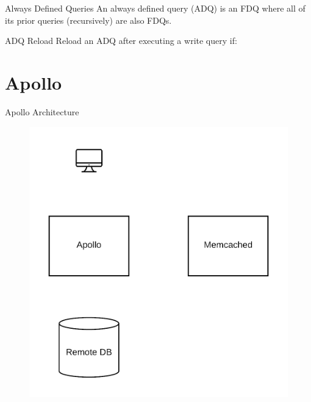 \documentclass[10pt]{beamer}
\begin{document}
\begin{frame}[fragile]{Always Defined Queries}
    An \alert{always defined query} (ADQ) is an FDQ where all of its prior queries (recursively) are also FDQs.\\
\medskip
\end{frame}

\begin{frame}[fragile]{ADQ Reload}
Reload an ADQ after executing a write query if:
\begin{itemize}
\end{itemize}
\end{frame}

\section{Apollo}

\begin{frame}[fragile]{Apollo Architecture}
    \begin{figure}
        \includegraphics[scale=0.17]{apollo_arch_diagram}
    \end{figure}
\end{frame}
\end{document}
